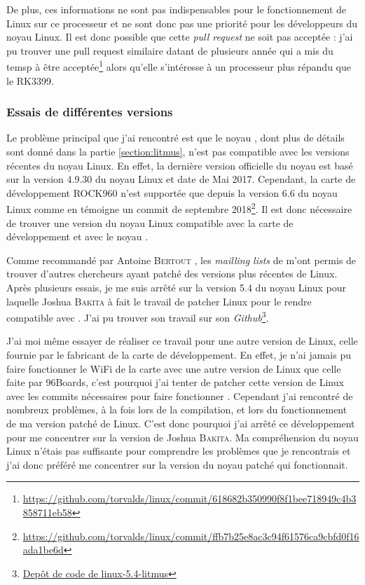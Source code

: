 De plus, ces informations ne sont pas indispensables pour le fonctionnement de Linux sur ce processeur et ne sont donc pas une priorité pour les développeurs du noyau Linux. Il est donc possible que cette \textit{pull request} ne soit pas acceptée : j'ai pu trouver une pull request similaire datant de plusieurs année qui a mis du temsp à être acceptée\footnote{\href{https://github.com/torvalds/linux/commit/618682b350990f8f1bee718949c4b3858711eb58}{https://github.com/torvalds/linux/commit/618682b350990f8f1bee718949c4b3858711eb58}} alors qu'elle s'intéresse à un processeur plus répandu que le RK3399.


\subsubsection{Essais de différentes versions}

Le problème principal que j'ai rencontré est que le noyau \litmus, dont plus de détails sont donné dans la partie \ref{section:litmus}, n'est pas compatible avec les versions récentes du noyau Linux. En effet, la dernière version officielle du noyau \litmus est basé sur la version 4.9.30 du noyau Linux et date de Mai 2017. Cependant, la carte de développement ROCK960 n'est supportée que depuis la version 6.6 du noyau Linux comme en témoigne un commit de septembre 2018\footnote{\href{https://github.com/torvalds/linux/commit/ffb7b25e8ac3c94f61576ca9cbfd0f16ada1be6d}{https://github.com/torvalds/linux/commit/ffb7b25e8ac3c94f61576ca9cbfd0f16ada1be6d}}. Il est donc nécessaire de trouver une version du noyau Linux compatible avec la carte de développement et avec le noyau \litmus.

Comme recommandé par Antoine \textsc{Bertout} , les \textit{mailling lists} de \litmus m'ont permis de trouver d'autres chercheurs ayant patché des versions plus récentes de Linux. Après plusieurs essais, je me suis arrêté sur la version 5.4 du noyau Linux pour laquelle Joshua \textsc{Bakita} à fait le travail de patcher Linux pour le rendre compatible avec \litmus. J'ai pu trouver son travail sur son \textit{Github}\footnote{\href{https://github.com/JoshuaJB/litmus-rt/tree/linux-5.4-litmus}{Depôt de code de linux-5.4-litmus}}. 

J'ai moi même essayer de réaliser ce travail pour une autre version de Linux, celle fournie par le fabricant de la carte de développement. En effet, je n'ai jamais pu faire fonctionner le WiFi de la carte avec une autre version de Linux que celle faite par 96Boards, c'est pourquoi j'ai tenter de patcher cette version de Linux avec les commits nécessaires pour faire fonctionner \litmus. Cependant j'ai rencontré de nombreux problèmes, à la fois lors de la compilation, et lors du fonctionnement de ma version patché de Linux. C'est donc pourquoi j'ai arrêté ce développement pour me concentrer sur la version de Joshua \textsc{Bakita}. Ma compréhension du noyau Linux n'étais pas suffisante pour comprendre les problèmes que je rencontrais et j'ai donc préféré me concentrer sur la version du noyau patché qui fonctionnait.

